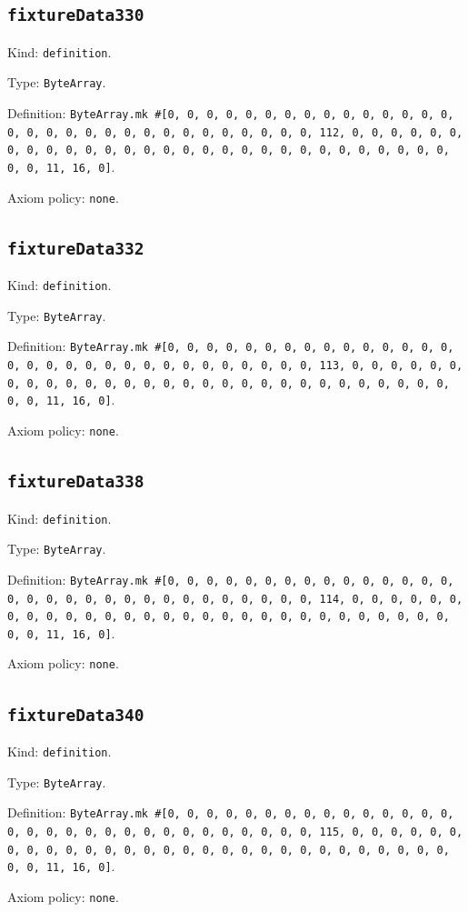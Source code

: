 \documentclass[11pt]{article}
\begin{document}
\subsection*{\texttt{fixtureData330}}
\noindent Kind: \texttt{definition}.\par
\noindent Type: \texttt{ByteArray}.\par
\noindent Definition: \texttt{ByteArray.mk \#[0, 0, 0, 0, 0, 0, 0, 0, 0, 0, 0, 0, 0, 0, 0, 0, 0, 0, 0, 0, 0, 0, 0, 0, 0, 0, 0, 0, 0, 0, 0, 112, 0, 0, 0, 0, 0, 0, 0, 0, 0, 0, 0, 0, 0, 0, 0, 0, 0, 0, 0, 0, 0, 0, 0, 0, 0, 0, 0, 0, 0, 0, 0, 11, 16, 0]}.\par
\noindent Axiom policy: \texttt{none}.\par
\subsection*{\texttt{fixtureData332}}
\noindent Kind: \texttt{definition}.\par
\noindent Type: \texttt{ByteArray}.\par
\noindent Definition: \texttt{ByteArray.mk \#[0, 0, 0, 0, 0, 0, 0, 0, 0, 0, 0, 0, 0, 0, 0, 0, 0, 0, 0, 0, 0, 0, 0, 0, 0, 0, 0, 0, 0, 0, 0, 113, 0, 0, 0, 0, 0, 0, 0, 0, 0, 0, 0, 0, 0, 0, 0, 0, 0, 0, 0, 0, 0, 0, 0, 0, 0, 0, 0, 0, 0, 0, 0, 11, 16, 0]}.\par
\noindent Axiom policy: \texttt{none}.\par
\subsection*{\texttt{fixtureData338}}
\noindent Kind: \texttt{definition}.\par
\noindent Type: \texttt{ByteArray}.\par
\noindent Definition: \texttt{ByteArray.mk \#[0, 0, 0, 0, 0, 0, 0, 0, 0, 0, 0, 0, 0, 0, 0, 0, 0, 0, 0, 0, 0, 0, 0, 0, 0, 0, 0, 0, 0, 0, 0, 114, 0, 0, 0, 0, 0, 0, 0, 0, 0, 0, 0, 0, 0, 0, 0, 0, 0, 0, 0, 0, 0, 0, 0, 0, 0, 0, 0, 0, 0, 0, 0, 11, 16, 0]}.\par
\noindent Axiom policy: \texttt{none}.\par
\subsection*{\texttt{fixtureData340}}
\noindent Kind: \texttt{definition}.\par
\noindent Type: \texttt{ByteArray}.\par
\noindent Definition: \texttt{ByteArray.mk \#[0, 0, 0, 0, 0, 0, 0, 0, 0, 0, 0, 0, 0, 0, 0, 0, 0, 0, 0, 0, 0, 0, 0, 0, 0, 0, 0, 0, 0, 0, 0, 115, 0, 0, 0, 0, 0, 0, 0, 0, 0, 0, 0, 0, 0, 0, 0, 0, 0, 0, 0, 0, 0, 0, 0, 0, 0, 0, 0, 0, 0, 0, 0, 11, 16, 0]}.\par
\noindent Axiom policy: \texttt{none}.\par
\end{document}
